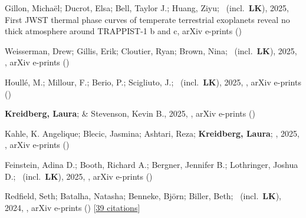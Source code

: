 \item[{\color{numcolor}\scriptsize18}] Gillon, Micha{\"e}l; Ducrot, Elsa; Bell, Taylor J.; Huang, Ziyu; \etal\ (incl.\ \textbf{LK}), 2025, First JWST thermal phase curves of temperate terrestrial exoplanets reveal no thick atmosphere around TRAPPIST-1 b and c, arXiv e-prints ()

\item[{\color{numcolor}\scriptsize17}] Weisserman, Drew; Gillis, Erik; Cloutier, Ryan; Brown, Nina; \etal\ (incl.\ \textbf{LK}), 2025, , arXiv e-prints ()

\item[{\color{numcolor}\scriptsize16}] Houll{\'e}, M.; Millour, F.; Berio, P.; Scigliuto, J.; \etal\ (incl.\ \textbf{LK}), 2025, , arXiv e-prints ()

\item[{\color{numcolor}\scriptsize15}] \textbf{Kreidberg, Laura}; \& Stevenson, Kevin B., 2025, , arXiv e-prints ()

\item[{\color{numcolor}\scriptsize14}] Kahle, K. Angelique; Blecic, Jasmina; Ashtari, Reza; \textbf{Kreidberg, Laura}; \etal, 2025, , arXiv e-prints ()

\item[{\color{numcolor}\scriptsize13}] Feinstein, Adina D.; Booth, Richard A.; Bergner, Jennifer B.; Lothringer, Joshua D.; \etal\ (incl.\ \textbf{LK}), 2025, , arXiv e-prints ()

\item[{\color{numcolor}\scriptsize12}] Redfield, Seth; Batalha, Natasha; Benneke, Bj{\"o}rn; Biller, Beth; \etal\ (incl.\ \textbf{LK}), 2024, , arXiv e-prints () [\href{https://ui.adsabs.harvard.edu/abs/2024arXiv240402932R}{39 citations}]

